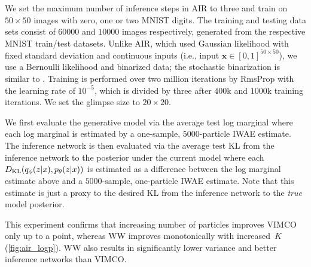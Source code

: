 We set the maximum number of inference steps in \gls{AIR} to three and train on $50 \times 50$ images with zero, one or two \acrshort{MNIST} digits.
%
The training and testing data sets consist of $60000$ and $10000$ images respectively, generated from the respective \acrshort{MNIST} train/test datasets.
%
Unlike \gls{AIR}, which used Gaussian likelihood with fixed standard deviation and continuous inputs (i.e., input $\mathbf{x} \in [0, 1]^{50 \times 50}$), we use a Bernoulli likelihood and binarized data; the stochastic binarization is similar to \citet{burda2016importance}.
%
%
Training is performed over two million iterations by RmsProp \citep{tieleman2012rms} with the learning rate of $10^{-5}$, which is divided by three after $400$k and $1000$k training iterations.
%
We set the glimpse size to $20 \times 20$.

We first evaluate the generative model via the average test log marginal where each log marginal is estimated by a one-sample, $5000$-particle \gls{IWAE} estimate.
%
The inference network is then evaluated via the average test \gls{KL} from the inference network to the posterior under the current model where each $D_{\mathrm{KL}}(q_\phi(z \lvert x), p_\theta(z \lvert x))$ is estimated as a difference between the log marginal estimate above and a $5000$-sample, one-particle \gls{IWAE} estimate.
%
Note that this estimate is just a proxy to the desired \gls{KL} from the inference network to the \emph{true} model posterior.
%

This experiment confirms that increasing number of particles improves \gls{VIMCO} only up to a point, whereas \gls{WW} improves monotonically with increased~\(K\) (\cref{fig:air_logp}).
%
\Gls{WW} also results in significantly lower variance and better inference networks than \gls{VIMCO}.

